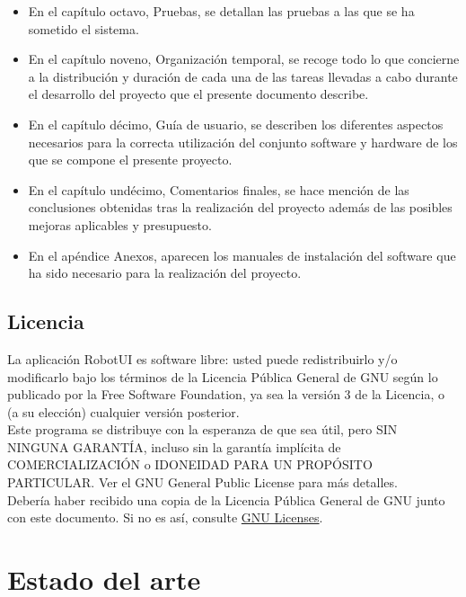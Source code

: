 \documentclass[a4paper,12pt]{article}
\begin{document}
\begin{itemize}
\item En el capítulo octavo, Pruebas, se detallan las pruebas a las que se ha sometido el sistema.

\item En el capítulo noveno, Organización temporal, se recoge todo lo que concierne a la distribución y duración de cada una de las tareas llevadas a cabo durante el desarrollo del proyecto que el presente documento describe.

\item En el capítulo décimo, Guía de usuario, se describen los diferentes aspectos necesarios para la correcta utilización del conjunto software y hardware de los que se compone el presente proyecto.

\item En el capítulo undécimo, Comentarios finales, se hace mención de las conclusiones obtenidas tras la realización del proyecto además de las posibles mejoras aplicables y presupuesto.

\item En el apéndice Anexos, aparecen los manuales de instalación del software que ha sido necesario para la realización del proyecto.

\end{itemize}


\subsection{Licencia}

La aplicación RobotUI es software libre: usted puede redistribuirlo y/o modificarlo bajo los términos de la Licencia Pública General de GNU según lo publicado por la Free Software Foundation, ya sea la versión 3 
de la Licencia, o (a su elección) cualquier versión posterior.\\

Este programa se distribuye con la esperanza de que sea útil, pero SIN NINGUNA GARANTÍA, incluso sin la garantía implícita de COMERCIALIZACIÓN o IDONEIDAD PARA UN PROPÓSITO PARTICULAR. Ver el GNU
General Public License para más detalles.\\

Debería haber recibido una copia de la Licencia Pública General de GNU junto con este documento. Si no es así, consulte \href{http://www.gnu.org/licenses/}{GNU Licenses}.\\


\section{ Estado del arte }
\end{document}
